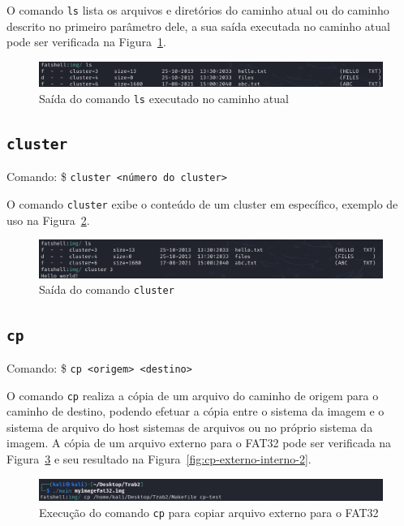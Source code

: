 \documentclass[
    12pt,				%
    oneside,   	        %
    a4paper,			%
    english,			%
    french,				%
    spanish,			%
    brazil,				%
    ]{pacotes/abntex2}
\begin{document}
O comando \texttt{ls} lista os arquivos e diretórios do caminho atual ou do caminho descrito no primeiro parâmetro dele, a sua saída executada no caminho atual pode ser verificada na Figura~\ref{fig:ls}.

\begin{figure}[H]
    \centering
    \includegraphics[width=450pt]{figuras/resultados/1-ls.PNG}
    \caption{Saída do comando \texttt{ls} executado no caminho atual}
    \label{fig:ls}
\end{figure}


\subsection{\texttt{cluster}}
\label{subsec:cluster}
Comando: \$ \texttt{cluster <número do cluster>}

O comando \texttt{cluster} exibe o conteúdo de um cluster em específico, exemplo de uso na Figura~\ref{fig:cluester}.

\begin{figure}[H]
    \centering
    \includegraphics[width=450pt]{figuras/resultados/2-cluster.PNG}
    \caption{Saída do comando \texttt{cluster}}
    \label{fig:cluester}
\end{figure}


\subsection{\texttt{cp}}
\label{subsec:cp}
Comando: \$ \texttt{cp <origem> <destino>}  

O comando \texttt{cp} realiza a cópia de um arquivo do caminho de origem para o caminho de destino, podendo efetuar a cópia entre o sistema da imagem e o sistema de arquivo do host sistemas de arquivos ou no próprio sistema da imagem. A cópia de um arquivo externo para o FAT32 pode ser verificada na Figura~\ref{fig:cp-externo-interno-1} e seu resultado na Figura~\ref{fig:cp-externo-interno-2}.

\begin{figure}[H]
    \centering
    \includegraphics[width=450pt]{figuras/resultados/3.1-cp-externo-interno.PNG}
    \caption{Execução do comando \texttt{cp} para copiar arquivo externo para o FAT32}
    \label{fig:cp-externo-interno-1}
\end{figure}
\end{document}
